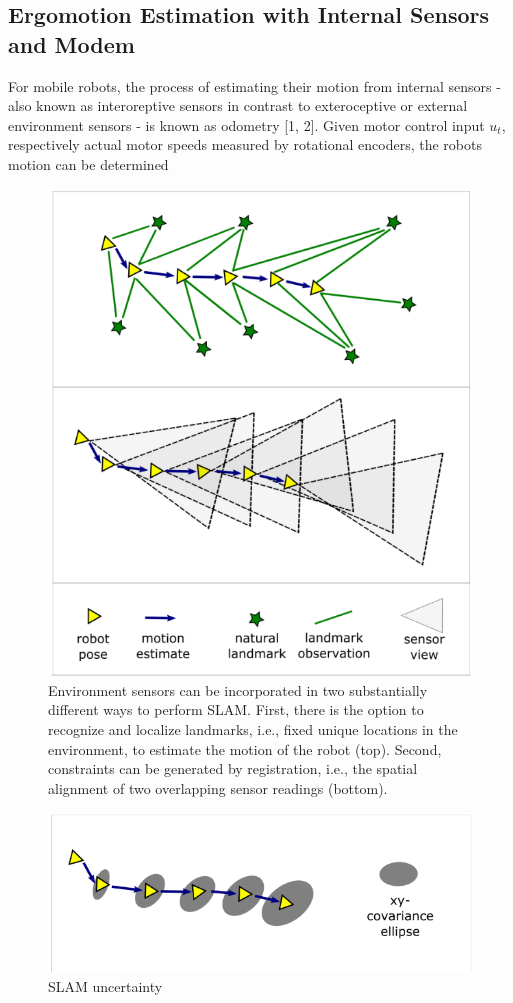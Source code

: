 \documentclass{article}
\begin{document}
\subsection{Ergomotion Estimation with Internal Sensors and Modem}
For mobile robots, the process of estimating their motion from internal sensors - also known as interoreptive sensors in contrast to exteroceptive or external environment sensors - is known as odometry [1, 2]. Given motor control input $\mathit{u_{t}}$, respectively actual motor speeds measured by rotational encoders, the robots motion can be determined
\begin{figure}
    \centering
    \includegraphics{images/fig1.png}
    \caption{Environment sensors can be incorporated in two substantially different ways to perform SLAM. First, there is the option to recognize and localize landmarks, i.e., fixed unique locations in the environment, to estimate the motion of the robot (top). Second, constraints can be generated by registration, i.e., the spatial alignment of two overlapping sensor readings (bottom).}
    \label{fig:figureune}
\end{figure}

\begin{figure}
    \centering
    \includegraphics{images/fig2.png}
    \caption{SLAM uncertainty}
    \label{fig:figuredeux}
\end{figure}
\end{document}
